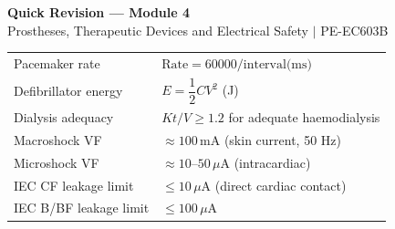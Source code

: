 \documentclass[12pt,a4paper]{article}
\renewcommand{\arraystretch}{1.45}
\begin{document}
\newpage
\begin{center}
  {\large\bfseries\color{myred} Quick Revision --- Module 4}\\[3pt]
  {\small\color{mydark} Prostheses, Therapeutic Devices and Electrical Safety $|$ PE-EC603B}
\end{center}
\noindent{\color{myred}\rule{\linewidth}{1.2pt}}
\vspace{4pt}

\begin{tcolorbox}[formulabox, title={\textbf{Key Formulas and Thresholds}}]
\renewcommand{\arraystretch}{1.3}
\begin{tabularx}{\linewidth}{B{4.2cm} X}
Pacemaker rate & $\text{Rate} = 60000 / \text{interval(ms)}$ \\[4pt]
Defibrillator energy & $E = \dfrac{1}{2}CV^2$ \quad (J) \\[8pt]
Dialysis adequacy & $Kt/V \geq 1.2$ for adequate haemodialysis \\[4pt]
Macroshock VF & $\approx 100\,\text{mA}$ (skin current, 50 Hz) \\[4pt]
Microshock VF & $\approx 10$--$50\,\mu\text{A}$ (intracardiac) \\[4pt]
IEC CF leakage limit & $\leq 10\,\mu\text{A}$ (direct cardiac contact) \\[4pt]
IEC B/BF leakage limit & $\leq 100\,\mu\text{A}$
\end{tabularx}
\end{tcolorbox}
\end{document}
